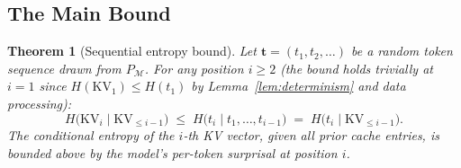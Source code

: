 \documentclass[11pt]{article}
\newtheorem{theorem}{Theorem}
\begin{document}
\subsection{The Main Bound}

\begin{theorem}[Sequential entropy bound]
\label{thm:seq_bound}
Let $\mathbf{t} = (t_1, t_2, \ldots)$ be a random token sequence drawn from
$P_{\mathcal{M}}$.  For any position $i \geq 2$ (the bound holds trivially at $i=1$ since
$H(\mathrm{KV}_1) \leq H(t_1)$ by Lemma~\ref{lem:determinism} and data processing):
\[
  H\bigl(\mathrm{KV}_i \mid \mathrm{KV}_{\leq i-1}\bigr)
  \;\leq\;
  H\bigl(t_i \mid t_1, \ldots, t_{i-1}\bigr)
  \;=\;
  H\bigl(t_i \mid \mathrm{KV}_{\leq i-1}\bigr).
\]
The conditional entropy of the $i$-th KV vector, given all prior cache entries,
is bounded above by the model's per-token surprisal at position $i$.
\end{theorem}
\end{document}
